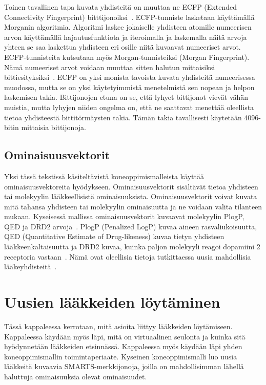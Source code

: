 \documentclass[finnish,twoside,censored,tkt,sw-line]{HYthesisML}
\begin{document}
Toinen tavallinen tapa kuvata yhdisteitä on muuttaa ne ECFP (Extended Connectivity Fingerprint) bitttijonoiksi~\cite{RogersDavid2010EF}.
ECFP-tunniste lasketaan käyttämällä Morganin algoritmia.
Algoritmi laskee jokaiselle yhdisteen atomille numeerisen arvon käyttämällä hajautusfunktiota ja iteroimalla ja laskemalla näitä arvoja yhteen se saa laskettua yhdisteen eri osille niitä kuvaavat numeeriset arvot.
ECFP-tunnisteita kutsutaan myös Morgan-tunnisteiksi (Morgan Fingerprint).
Nämä numeeriset arvot voidaan muuttaa sitten halutun mittaisiksi bittiesityksiksi~\cite{RogersDavid2010EF}.
ECFP on yksi monista tavoista kuvata yhdisteitä numeerisessa muodossa, mutta se on yksi käytetyimmistä menetelmistä sen nopean ja helpon laskemisen takia.
Bittijonojen etuna on se, että lyhyet bittijonot vievät vähän muistia, mutta lyhyjen niiden ongelma on, että ne saattavat menettää oleellista tietoa yhdisteestä bittitörmäysten takia.
Tämän takia tavallisesti käytetään 4096-bitin mittaisia bittijonoja.

\section{Ominaisuusvektorit}

Yksi tässä tekstissä käsiteltävistä koneoppimismalleista käyttää ominaisuusvektoreita hyödykseen.
Ominaisuusvektorit sisältävät tietoa yhdisteen tai molekyylin lääkkeellisistä ominaisuuksista.
Ominaisuusvektorit voivat kuvata mitä tahansa yhdisteen tai molekyylin ominaisuutta ja ne voidaan valita tilanteen mukaan.
Kyseisessä mallissa ominaisuusvektorit kuvaavat molekyylin PlogP, QED ja DRD2 arvoja~\cite{ShinBonggun}.
PlogP (Penalized LogP) kuvaa aineen rasvaliukoisuutta, QED (Quantitative Estimate of Drug-likeness) kuvaa tietyn yhdisteen lääkkeenkaltaisuutta ja DRD2 kuvaa, kuinka paljon molekyyli reagoi dopamiini 2 receptoria vastaan~\cite{BickertonGRichard2012Qtcb}.
Nämä ovat oleellisia tietoja tutkittaessa uusia mahdollisia lääkeyhdisteitä~\cite{ShinBonggun}.

\chapter{Uusien lääkkeiden löytäminen}

Tässä kappaleessa kerrotaan, mitä asioita liittyy lääkkeiden löytämiseen.
Kappaleessa käydään myös läpi, mitä on virtuaalinen seulonta ja kuinka sitä hyödynnetään lääkkeiden etsinnässä.
Kappaleessa myös käydään läpi yhden koneoppimismallin toimintaperiaate.
Kyseinen koneoppimismalli luo uusia lääkkeitä kuvaavia SMARTS-merkkijonoja, joilla on mahdollisimman lähellä haluttuja ominaisuuksia olevat ominaisuudet.
\end{document}
